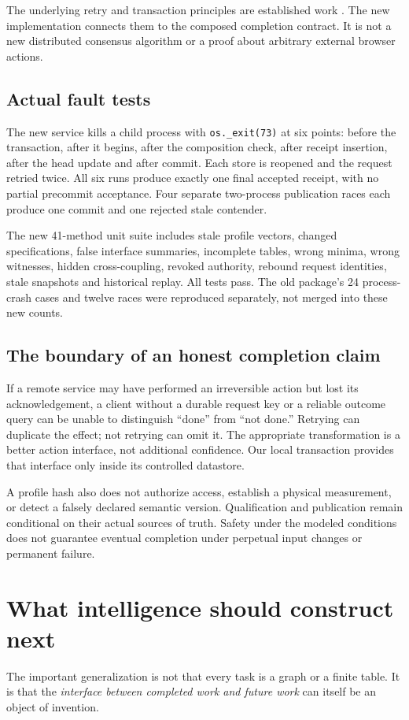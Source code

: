\documentclass[11pt,letterpaper]{article}
\theoremstyle{definition}\newtheorem{definition}[theorem]{Definition}
\theoremstyle{remark}\newtheorem{remark}[theorem]{Remark}
\begin{document}
The underlying retry and transaction principles are established work \citep{rifl,sqlite}. The new implementation connects them to the composed completion contract. It is not a new distributed consensus algorithm or a proof about arbitrary external browser actions.

\subsection{Actual fault tests}
The new service kills a child process with \texttt{os.\_exit(73)} at six points: before the transaction, after it begins, after the composition check, after receipt insertion, after the head update and after commit. Each store is reopened and the request retried twice. All six runs produce exactly one final accepted receipt, with no partial precommit acceptance. Four separate two-process publication races each produce one commit and one rejected stale contender.

The new 41-method unit suite includes stale profile vectors, changed specifications, false interface summaries, incomplete tables, wrong minima, wrong witnesses, hidden cross-coupling, revoked authority, rebound request identities, stale snapshots and historical replay. All tests pass. The old package's 24 process-crash cases and twelve races were reproduced separately, not merged into these new counts.

\subsection{The boundary of an honest completion claim}
If a remote service may have performed an irreversible action but lost its acknowledgement, a client without a durable request key or a reliable outcome query can be unable to distinguish ``done'' from ``not done.'' Retrying can duplicate the effect; not retrying can omit it. The appropriate transformation is a better action interface, not additional confidence. Our local transaction provides that interface only inside its controlled datastore.

A profile hash also does not authorize access, establish a physical measurement, or detect a falsely declared semantic version. Qualification and publication remain conditional on their actual sources of truth. Safety under the modeled conditions does not guarantee eventual completion under perpetual input changes or permanent failure.

\section{What intelligence should construct next}
\label{sec:program}
The important generalization is not that every task is a graph or a finite table. It is that the \emph{interface between completed work and future work} can itself be an object of invention.
\end{document}
